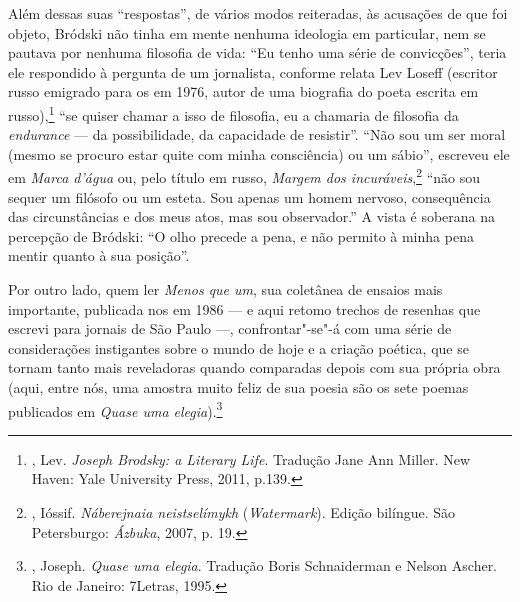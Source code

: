 Além dessas suas ``respostas'', de vários modos reiteradas, às
acusações de que foi objeto, Bródski não tinha em mente nenhuma
ideologia em particular, nem se pautava por nenhuma filosofia de vida:
``Eu tenho uma série de convicções'', teria ele respondido à
pergunta de um jornalista, conforme relata Lev Loseff (escritor russo emigrado
para os  em 1976, autor de uma biografia do poeta escrita
em russo),\footnote{, Lev. \emph{Joseph
 Brodsky: a Literary Life}. Tradução Jane Ann Miller. New Haven:
 Yale University Press, 2011, p.139.} ``se quiser
chamar a isso de filosofia, eu a chamaria de filosofia da
\emph{endurance} --- da possibilidade, da capacidade de resistir''.
``Não sou um ser moral (mesmo se procuro estar quite com minha
consciência) ou um sábio'', escreveu ele em \emph{Marca d'água} ou, pelo título em russo, \emph{Margem dos
incuráveis},\footnote{, Ióssif.
 \emph{Náberejnaia neistselímykh} (\emph{Watermark}). Edição bilíngue.
 São Petersburgo: \emph{Ázbuka}, 2007, p. 19.} ``não sou sequer um filósofo ou um
esteta. Sou apenas um homem nervoso, consequência das circunstâncias e
dos meus atos, mas sou observador.'' A vista é soberana na percepção de
Bródski: ``O olho precede a pena, e não permito à minha pena mentir
quanto à sua posição''.

Por outro lado, quem ler \emph{Menos que um}, sua coletânea de ensaios
mais importante, publicada nos  em 1986 --- e aqui
retomo trechos de resenhas que escrevi para jornais de São Paulo ---,
confrontar"-se"-á com uma série de considerações instigantes sobre o mundo de hoje e a criação poética, que se tornam tanto mais
reveladoras quando comparadas depois com sua própria obra (aqui, entre
nós, uma amostra muito feliz de sua poesia são os sete poemas publicados
em \emph{Quase uma elegia}).\footnote{,
 Joseph. \emph{Quase uma elegia}. Tradução Boris Schnaiderman e Nelson
 Ascher. Rio de Janeiro: 7Letras, 1995.}

